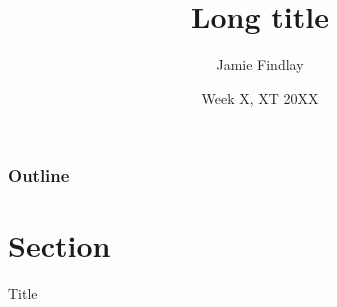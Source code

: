 \documentclass[a4paper,%
]{beamer}
\title[Short title]{Long title}
\author{Jamie Findlay}
\institute[]{Faculty of Linguistics, Philology, and Phonetics}
\date{Week X, XT 20XX}
\begin{document}
\begin{frame}
  \thispagestyle{empty}
  \titlepage
\end{frame}

\begin{frame}
  \frametitle{Outline}
  \setcounter{tocdepth}{2}
  \tableofcontents
\end{frame}

\section{Section}
\begin{frame}{Title}

\end{frame}
\end{document}
